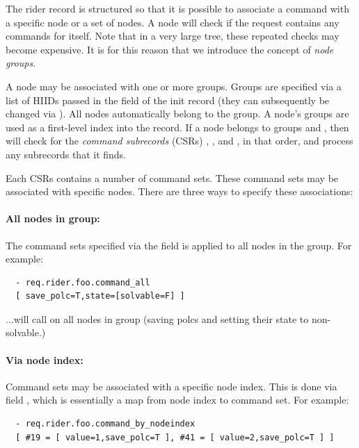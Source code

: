 \documentclass[10pt,twoside]{book}
\begin{document}
  The rider record is structured so that it is possible to associate a command
  with a specific node or a set of nodes. A node will check if the request
  contains any commands for itself. Note that in a very large tree, these
  repeated checks may become expensive. It is for this reason that we introduce
  the concept of {\em node groups}. 
  
  A node may be associated with one or more groups. Groups are specified via a
  list of HIIDs passed in the  field of the init record (they
  can subsequently be changed via ). All nodes automatically
  belong to the  group. A node's groups are used as a first-level index
  into the  record. If a node belongs to groups  and
  , then  will check for the {\em command
  subrecords}\/ (CSRs) , , and , in
  that order, and process any subrecords that it finds.

  Each CSRs contains a number of command sets. These command sets may be
  associated with specific nodes. There are three ways to specify these
  associations:
  
  \paragraph{All nodes in group:} The command sets specified via the field
   is applied to all nodes in the group. For example:

\begin{verbatim}
  - req.rider.foo.command_all
  [ save_polc=T,state=[solvable=F] ]  
\end{verbatim}

  ...will call  on all nodes in group  (saving
  polcs and setting their state to non-solvable.)

  \paragraph{Via node index:} Command sets may be associated with a specific
  node index. This is done via field , which is
  essentially a map from node index to command set. For example:

\begin{verbatim}
  - req.rider.foo.command_by_nodeindex
  [ #19 = [ value=1,save_polc=T ], #41 = [ value=2,save_polc=T ] ]
\end{verbatim}
\end{document}
